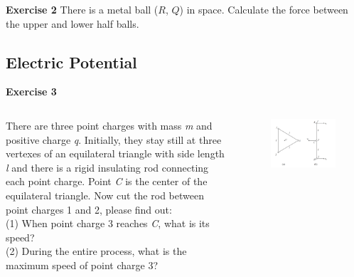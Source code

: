 \documentclass{beamer}
\begin{document}
\begin{frame}{\bf Exercise 2}
There is a metal ball ($R$, $Q$) in space. Calculate the force between the upper and lower half balls.

\begin{figure}[htbp]
    \centering
\end{figure}
\end{frame}

\subsection{\bf Electric Potential}
\begin{frame}{\bf Exercise 3}
    \begin{columns}
        \begin{column}{0.6\linewidth}
        There are three point charges with mass \textit{m} and positive charge \textit{q}. Initially, they stay still 
        at three vertexes of an equilateral triangle with side length \textit{l} and there is a rigid insulating rod connecting each 
        point charge. Point \textit{C} is the center of the equilateral triangle. Now cut the rod between point charges 1 and 2, please find out:\\
        (1) When point charge 3 reaches \textit{C}, what is its speed?\\
        (2) During the entire process, what is the maximum speed of point charge 3?
        \end{column}
        \begin{column}{.4\linewidth}
            \begin{figure}[H]
                \centering
                \includegraphics[scale=0.4]{images/009.png}
                \end{figure}
        \end{column}
    \end{columns}
\end{frame}
\end{document}
